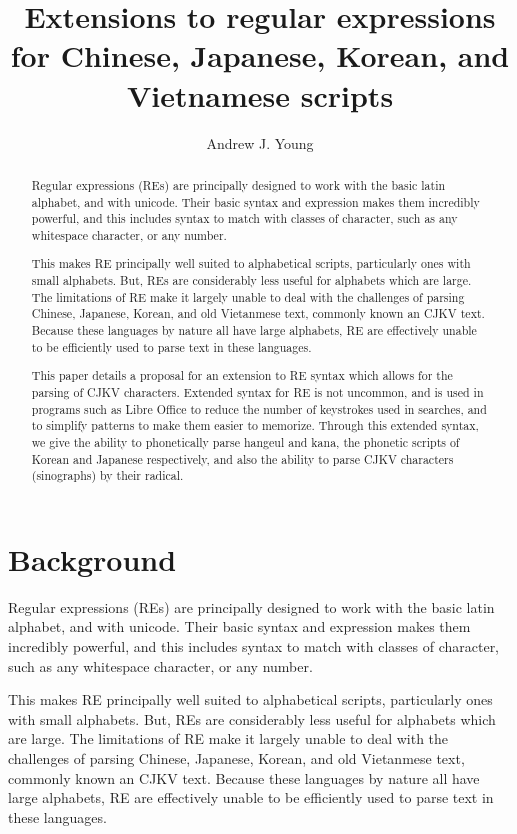 \documentclass{article}
\title{Extensions to regular expressions for Chinese, Japanese, Korean, and
Vietnamese scripts}
\author{Andrew J. Young}
\begin{document}
\maketitle

\begin{abstract}

Regular expressions (REs) are principally designed to work with the basic latin
  alphabet, and with unicode. Their basic syntax and expression makes them
  incredibly powerful, and this includes syntax to match with classes of
  character, such as any whitespace character, or any number.

  This makes RE principally well suited to alphabetical scripts, particularly
  ones with small alphabets. But, REs are considerably less useful for alphabets
  which are large. The limitations of RE make it largely unable to deal with the
  challenges of parsing Chinese, Japanese, Korean, and old Vietanmese text,
  commonly known an CJKV text. Because these languages by nature all have large
  alphabets, RE are effectively unable to be efficiently used to parse text in
  these languages.

  This paper details a proposal for an extension to RE syntax which allows for
  the parsing of CJKV characters. Extended syntax for RE is not uncommon, and is
  used in programs such as Libre Office to reduce the number of keystrokes used
  in searches, and to simplify patterns to make them easier to memorize. Through
  this extended syntax, we give the ability to phonetically parse hangeul and
  kana, the phonetic scripts of Korean and Japanese respectively, and also the
  ability to parse CJKV characters (sinographs) by their radical.

\end{abstract}

\section{Background}

Regular expressions (REs) are principally designed to work with the basic latin
  alphabet, and with unicode. Their basic syntax and expression makes them
  incredibly powerful, and this includes syntax to match with classes of
  character, such as any whitespace character, or any number.

  This makes RE principally well suited to alphabetical scripts, particularly
  ones with small alphabets. But, REs are considerably less useful for alphabets
  which are large. The limitations of RE make it largely unable to deal with the
  challenges of parsing Chinese, Japanese, Korean, and old Vietanmese text,
  commonly known an CJKV text. Because these languages by nature all have large
  alphabets, RE are effectively unable to be efficiently used to parse text in
  these languages.
\end{document}
